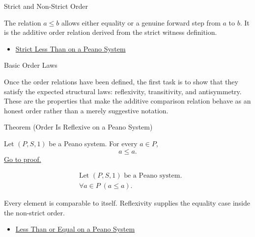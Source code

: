 \begin{topicbox}{Strict and Non-Strict Order}
\begin{remark*}[Interpretation]
The relation $a \le b$ allows either equality or a genuine forward step from
$a$ to $b$. It is the additive order relation derived from the strict witness
definition.
\end{remark*}

\begin{dependencies}
\begin{itemize}
  \item \hyperref[def:strict-less-than-on-peano-system]{Strict Less Than on a Peano System}
\end{itemize}
\end{dependencies}
\end{topicbox}

\begin{topicbox}{Basic Order Laws}
\begin{exposition}
Once the order relations have been defined, the first task is to show that
they satisfy the expected structural laws: reflexivity, transitivity, and
antisymmetry. These are the properties that make the additive comparison
relation behave as an honest order rather than a merely suggestive notation.
\end{exposition}

\begin{theorembox}{Theorem (Order Is Reflexive on a Peano System)}
\begin{theorem}
\label{thm:order-reflexive-on-peano-system}
Let $(P,S,1)$ be a Peano system. For every $a \in P$,
\[
a \le a.
\]
\hyperref[prf:order-reflexive-on-peano-system]{Go to proof.}
\end{theorem}
\end{theorembox}

\begin{remark*}
\[
\begin{aligned}
&\text{Let } (P,S,1) \text{ be a Peano system.}\\
&\forall a \in P\;(a \le a).
\end{aligned}
\]
\end{remark*}

\begin{remark*}[Interpretation]
Every element is comparable to itself. Reflexivity supplies the equality case
inside the non-strict order.
\end{remark*}

\begin{dependencies}
\begin{itemize}
  \item \hyperref[def:less-than-or-equal-on-peano-system]{Less Than or Equal on a Peano System}
\end{itemize}
\end{dependencies}


\end{topicbox}
